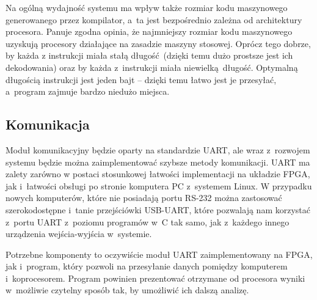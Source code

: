 Na ogólną wydajność systemu ma wpływ także rozmiar kodu maszynowego generowanego przez kompilator, a~ta jest bezpośrednio zależna od architektury procesora. Panuje zgodna opinia, że najmniejszy rozmiar kodu maszynowego uzyskują procesory działające na zasadzie maszyny stosowej. Oprócz tego dobrze, by każda z instrukcji miała stałą długość (dzięki temu dużo prostsze jest ich dekodowania) oraz by każda z~instrukcji miała niewielką długość. Optymalną długością instrukcji jest jeden bajt -- dzięki temu łatwo jest je przesyłać, a~program zajmuje bardzo niedużo miejsca.

\subsection{Komunikacja}
Moduł komunikacyjny będzie oparty na standardzie UART, ale wraz z~rozwojem systemu będzie można zaimplementować szybsze metody komunikacji. UART ma zalety zarówno w postaci stosunkowej łatwości implementacji na układzie FPGA, jak i~łatwości obsługi po stronie komputera PC z~systemem Linux. W przypadku nowych komputerów, które nie posiadają portu RS-232 można zastosować szerokodostępne i~tanie przejściówki USB-UART, które pozwalają nam korzystać z~portu UART z~poziomu programów w~C tak samo, jak z~każdego innego urządzenia wejścia-wyjścia w~systemie.

Potrzebne komponenty to oczywiście moduł UART zaimplementowany na FPGA, jak i~program, który pozwoli na przesyłanie danych pomiędzy komputerem i~koprocesorem. Program powinien prezentować otrzymane od procesora wyniki w~możliwie czytelny sposób tak, by umożliwić ich dalszą analizę.
